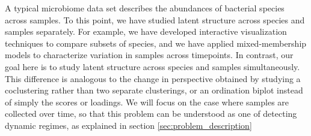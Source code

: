 \documentclass{article}
\begin{document}
A typical microbiome data set describes the abundances of bacterial species
across samples. To this point, we have studied latent structure across species
and samples separately. For example, we have developed interactive visualization
techniques to compare subsets of species, and we have applied mixed-membership
models to characterize variation in samples across timepoints. In contrast, our
goal here is to study latent structure across species and samples
simultaneously. This difference is analogous to the change in perspective
obtained by studying a coclustering rather than two separate clusterings, or an
ordination biplot instead of simply the scores or loadings. We will focus on the
case where samples are collected over time, so that this problem can be
understood as one of detecting dynamic regimes, as explained in section
\ref{sec:problem_description}


\end{document}
